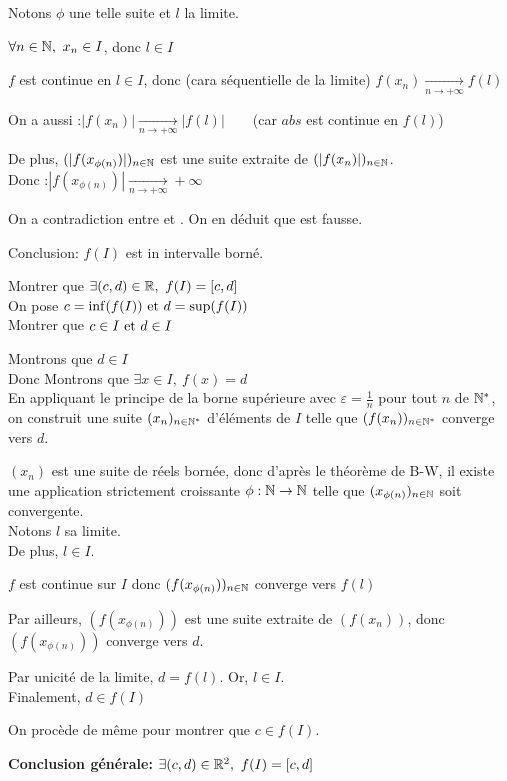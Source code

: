 \documentclass[12pt,twoside,a4paper]{article}
\begin{document}
\begin{preuve}
\begin{liste}
\begin{tab}
						Notons $\phi$ une telle suite et $l$ la limite.
						\begin{liste}
							\item $\forall n\in\mathbb{N},\ x_n\in I$, donc $l\in I$
							\item $f$ est continue en $l\in I$, donc (cara séquentielle de la limite) $f(x_n)\mathop{\longrightarrow}\limits_{n\rightarrow +\infty}f(l)$
							\item On a aussi :$|f(x_n)|\mathop{\longrightarrow}\limits_{n\rightarrow +\infty}|f(l)|$\ \ \ \ (car $abs$ est continue en $f(l)$)
							\item De plus, $(|f(x_{\phi(n)})|)_{n\in\mathbb{N}}$ est une suite extraite de $(|f(x_{n})|)_{n\in\mathbb{N}}$.\\
								Donc :$|f(x_{\phi(n)})|\mathop{\longrightarrow}\limits_{n\rightarrow +\infty}+\infty$
						\end{liste}
						On a contradiction entre  et . On en déduit que \fbox{HA} est fausse.
					\end{tab}
					Conclusion: $f(I)$ est in intervalle borné.
				\item Montrer que $\exists (c,d)\in\R,\ f(I)=[c,d]$\\
					On pose $c=\inf(f(I))\text{ et } d=\sup(f(I))$\\
					Montrer que $c\in I\text{ et } d\in I$
					\begin{liste}
						\item Montrons que $d\in I$\\
							Donc Montrons que $\exists x\in I,\ f(x)=d$\\
							En appliquant le principe de la borne supérieure avec $\varepsilon = \frac1{n}$ pour tout $n$ de $\mathbb{N}^{*}$, on construit une suite $(x_n)_{n\in\mathbb{N}^{*}}$ d'éléments de $I$ telle que $(f(x_n))_{n\in\mathbb{N}^{*}}$ converge vers $d$.
							\begin{liste}
								\item $(x_n)$ est une suite de réels bornée, donc d'après le théorème de B-W, il existe une application strictement croissante $\phi:\mathbb{N}\rightarrow\mathbb{N}$ telle que $(x_{\phi(n)})_{n\in\mathbb{N}}$ soit convergente.\\
									Notons $l$ sa limite.\\
									De plus, $l\in I$.
								\item $f$ est continue sur $I$ donc $(f(x_{\phi(n)}))_{n\in\mathbb{N}}$ converge vers $f(l)$
								\item Par ailleurs, $(f(x_{\phi(n)}))$ est une suite extraite de $(f(x_n))$, donc $(f(x_{\phi(n)}))$ converge vers $d$.
							\end{liste}
							Par unicité de la limite, $d=f(l)$. Or, $l\in I$.\\
							Finalement, $d\in f(I)$
						\item On procède de m\^eme pour montrer que $c\in f(I)$.
					\end{liste}
			\end{liste}
			\textbf{Conclusion générale:} $\exists (c,d)\in \mathbb{R}^{2},\ f(I)=[c,d]$
		\end{preuve}
\end{document}
